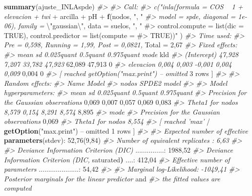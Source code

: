 \documentclass[11pt,b5paper,]{krantz}
\newenvironment{Shaded}{}{}
\newcommand{\CharTok}[1]{\textcolor[rgb]{0.25,0.44,0.63}{#1}}
\newcommand{\CommentTok}[1]{\textcolor[rgb]{0.38,0.63,0.69}{\textit{#1}}}
\newcommand{\DecValTok}[1]{\textcolor[rgb]{0.25,0.63,0.44}{#1}}
\newcommand{\ErrorTok}[1]{\textcolor[rgb]{1.00,0.00,0.00}{\textbf{#1}}}
\newcommand{\KeywordTok}[1]{\textcolor[rgb]{0.00,0.44,0.13}{\textbf{#1}}}
\newcommand{\NormalTok}[1]{#1}
\newcommand{\OperatorTok}[1]{\textcolor[rgb]{0.40,0.40,0.40}{#1}}
\newcommand{\StringTok}[1]{\textcolor[rgb]{0.25,0.44,0.63}{#1}}
\begin{document}
\begin{Shaded}
\begin{Highlighting}[]
\KeywordTok{summary}\NormalTok{(ajuste_INLAspde)}
\CommentTok{#>}
\CommentTok{#> Call:}
\CommentTok{#> c("inla(formula = COS ~ 1 + elevacion + twi}
\OperatorTok{+}\StringTok{ }\NormalTok{arcilla }\OperatorTok{+}\StringTok{ }\NormalTok{pH }\OperatorTok{+}\StringTok{ }\KeywordTok{f}\NormalTok{(nodos, }\StringTok{", "}
\CommentTok{#> model = spde, diagonal = 1e-06), family =}
\NormalTok{\textbackslash{}}\StringTok{"gaussian}\CharTok{\textbackslash{}"}\StringTok{, data = suelos, "}\NormalTok{, }\StringTok{"}
\StringTok{#> control.compute = list(dic = TRUE),}
\StringTok{control.predictor = list(compute =}
\StringTok{#> TRUE))"}\NormalTok{ )}
\CommentTok{#> Time used:}
\CommentTok{#> Pre = 0,598, Running = 1,99, Post = 0,0821,}
\NormalTok{Total =}\StringTok{ }\DecValTok{2}\NormalTok{,}\DecValTok{67}
\CommentTok{#> Fixed effects:}
\CommentTok{#> mean sd 0.025quant 0.5quant 0.975quant mode}
\NormalTok{kld}
\CommentTok{#> (Intercept) 47,928 7,207 33,782 47,923}
\DecValTok{62}\NormalTok{,}\DecValTok{089} \DecValTok{47}\NormalTok{,}\DecValTok{913} \DecValTok{0}
\CommentTok{#> elevacion 0,004 0,003 -0,001 0,004 0,009}
\DecValTok{0}\NormalTok{,}\DecValTok{004} \DecValTok{0}
\CommentTok{#> [ reached getOption("max.print") -- omitted}
\DecValTok{3}\NormalTok{ rows ]}
\CommentTok{#>}
\CommentTok{#> Random effects:}
\CommentTok{#> Name Model}
\CommentTok{#> nodos SPDE2 model}
\CommentTok{#>}
\CommentTok{#> Model hyperparameters:}
\CommentTok{#> mean sd 0.025quant 0.5quant 0.975quant}
\CommentTok{#> Precision for the Gaussian observations}
\DecValTok{0}\NormalTok{,}\DecValTok{069} \DecValTok{0}\NormalTok{,}\DecValTok{007} \DecValTok{0}\NormalTok{,}\DecValTok{057} \DecValTok{0}\NormalTok{,}\DecValTok{069} \DecValTok{0}\NormalTok{,}\DecValTok{083}
\CommentTok{#> Theta1 for nodos 8,579 0,154 8,291 8,574}
\DecValTok{8}\NormalTok{,}\DecValTok{895}
\CommentTok{#> mode}
\CommentTok{#> Precision for the Gaussian observations}
\DecValTok{0}\NormalTok{,}\DecValTok{069}
\CommentTok{#> Theta1 for nodos 8,554}
\CommentTok{#> [ reached 'max'}
    \OperatorTok{/}\StringTok{ }\KeywordTok{getOption}\NormalTok{(}\StringTok{"max.print"}\NormalTok{) }\OperatorTok{--}
\NormalTok{omitted }\DecValTok{1}\NormalTok{ rows ]}
\CommentTok{#>}
\CommentTok{#> Expected number of effective}
\KeywordTok{parameters}\NormalTok{(stdev)}\OperatorTok{:}\StringTok{ }\DecValTok{52}\NormalTok{,}\DecValTok{76}\NormalTok{(}\DecValTok{9}\NormalTok{,}\DecValTok{84}\NormalTok{)}
\CommentTok{#> Number of equivalent replicates : 6,63}
\CommentTok{#>}
\CommentTok{#> Deviance Information Criterion (DIC)}
\NormalTok{...............}\OperatorTok{:}\StringTok{ }\DecValTok{1988}\NormalTok{,}\DecValTok{52}
\CommentTok{#> Deviance Information Criterion (DIC,}
\NormalTok{saturated}\ErrorTok{)}\NormalTok{ ....}\OperatorTok{:}\StringTok{ }\DecValTok{412}\NormalTok{,}\DecValTok{04}
\CommentTok{#> Effective number of parameters}
\NormalTok{.....................}\OperatorTok{:}\StringTok{ }\DecValTok{54}\NormalTok{,}\DecValTok{42}
\CommentTok{#>}
\CommentTok{#> Marginal log-Likelihood: -1049,41}
\CommentTok{#> Posterior marginals for the linear predictor}
\NormalTok{and}
\CommentTok{#> the fitted values are computed}
\end{Highlighting}
\end{Shaded}
\end{document}
